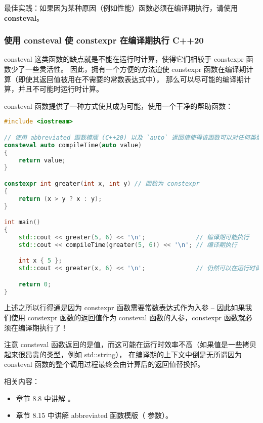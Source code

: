 \documentclass[../../LearnCpp.tex]{subfiles}
\begin{document}
最佳实践：如果因为某种原因（例如性能）函数必须在编译期执行，请使用 \textbf{consteval}。

\subsubsection*{使用 consteval 使 constexpr 在编译期执行 C++20}

consteval 这类函数的缺点就是不能在运行时计算，使得它们相较于 constexpr 函数少了一些灵活性。
因此，拥有一个方便的方法迫使 constexpr 函数在编译期计算（即使其返回值被用在不需要的常数表达式中），
那么可以尽可能的编译期计算，并且不可能时运行时计算。

consteval 函数提供了一种方式使其成为可能，使用一个干净的帮助函数：

\begin{lstlisting}[language=C++]
#include <iostream>

// 使用 abbreviated 函数模版 (C++20) 以及 `auto` 返回值使得该函数可以对任何类型值生效
consteval auto compileTime(auto value)
{
    return value;
}

constexpr int greater(int x, int y) // 函数为 constexpr
{
    return (x > y ? x : y);
}

int main()
{
    std::cout << greater(5, 6) << '\n';              // 编译期可能执行
    std::cout << compileTime(greater(5, 6)) << '\n'; // 编译期执行

    int x { 5 };
    std::cout << greater(x, 6) << '\n';              // 仍然可以在运行时调用 constexpr 版本

    return 0;
}
\end{lstlisting}

上述之所以行得通是因为 constexpr 函数需要常数表达式作为入参 --
因此如果我们使用 constexpr 函数的返回值作为 consteval 函数的入参，constexpr 函数就必须在编译期执行了！

注意 consteval 函数返回的是值，而这可能在运行时效率不高（如果值是一些拷贝起来很昂贵的类型，例如 std::string），
在编译期的上下文中倒是无所谓因为 consteval 函数的整个调用过程最终会由计算后的返回值替换掉。

相关内容：

\begin{itemize}
    \item 章节 8.8 中讲解 。
    \item 章节 8.15 中讲解 abbreviated 函数模版（ 参数）。
\end{itemize}
\end{document}
